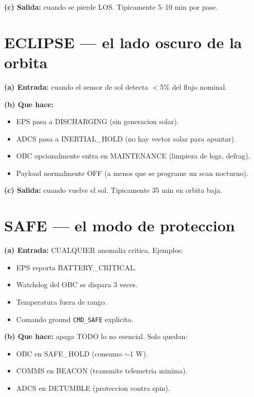 \documentclass[11pt,a4paper,oneside,openright]{book}
\begin{document}
\textbf{(c) Salida:} cuando se pierde LOS. Tipicamente 5--10 min por
pase.

\section{ECLIPSE --- el lado oscuro de la orbita}

\textbf{(a) Entrada:} cuando el sensor de sol detecta $<$5\% del
flujo nominal.

\textbf{(b) Que hace:}

\begin{itemize}[leftmargin=2em]
  \item EPS pasa a DISCHARGING (sin generacion solar).
  \item ADCS pasa a INERTIAL\_HOLD (no hay vector solar para apuntar).
  \item OBC opcionalmente entra en MAINTENANCE (limpieza de logs,
    defrag).
  \item Payload normalmente OFF (a menos que se programe un scan
    nocturno).
\end{itemize}

\textbf{(c) Salida:} cuando vuelve el sol. Tipicamente 35 min en
orbita baja.

\section{SAFE --- el modo de proteccion}

\textbf{(a) Entrada:} CUALQUIER anomalia critica. Ejemplos:

\begin{itemize}[leftmargin=2em]
  \item EPS reporta BATTERY\_CRITICAL.
  \item Watchdog del OBC se dispara 3 veces.
  \item Temperatura fuera de rango.
  \item Comando ground \texttt{CMD\_SAFE} explicito.
\end{itemize}

\textbf{(b) Que hace:} apaga TODO lo no esencial. Solo quedan:

\begin{itemize}[leftmargin=2em]
  \item OBC en SAFE\_HOLD (consumo $\sim$1 W).
  \item COMMS en BEACON (transmite telemetria minima).
  \item ADCS en DETUMBLE (proteccion contra spin).
\end{itemize}
\end{document}
